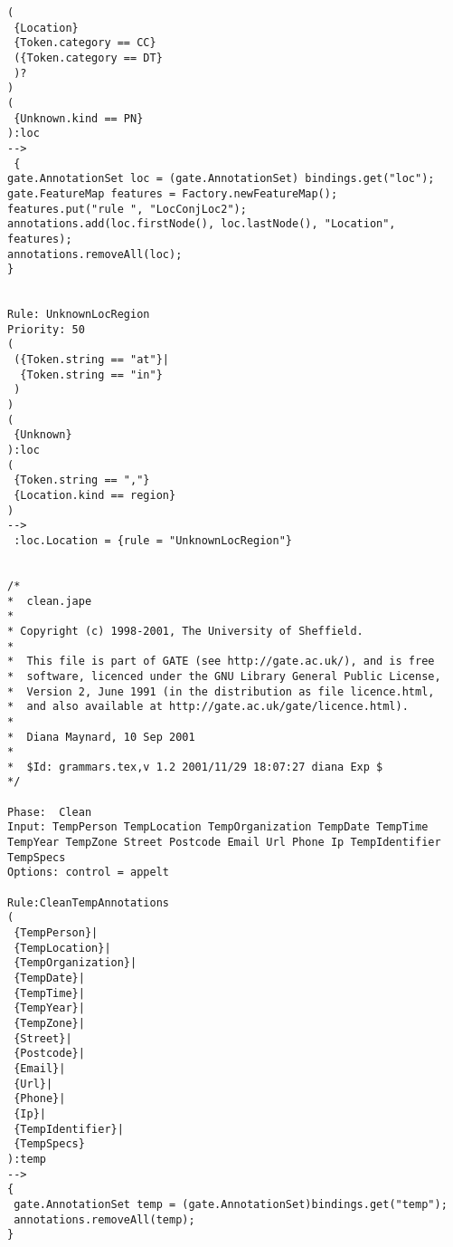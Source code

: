 \begin{verbatim}
(
 {Location}
 {Token.category == CC}
 ({Token.category == DT}
 )?
)
(
 {Unknown.kind == PN}
):loc
-->
 {
gate.AnnotationSet loc = (gate.AnnotationSet) bindings.get("loc");
gate.FeatureMap features = Factory.newFeatureMap();
features.put("rule ", "LocConjLoc2");
annotations.add(loc.firstNode(), loc.lastNode(), "Location",
features);
annotations.removeAll(loc);
}


Rule: UnknownLocRegion
Priority: 50
(
 ({Token.string == "at"}|
  {Token.string == "in"}
 )
)
( 
 {Unknown}
):loc
(
 {Token.string == ","}
 {Location.kind == region}
)
-->
 :loc.Location = {rule = "UnknownLocRegion"}


/*
*  clean.jape
*
* Copyright (c) 1998-2001, The University of Sheffield.
*
*  This file is part of GATE (see http://gate.ac.uk/), and is free
*  software, licenced under the GNU Library General Public License,
*  Version 2, June 1991 (in the distribution as file licence.html,
*  and also available at http://gate.ac.uk/gate/licence.html).
*
*  Diana Maynard, 10 Sep 2001
* 
*  $Id: grammars.tex,v 1.2 2001/11/29 18:07:27 diana Exp $
*/

Phase:	Clean
Input: TempPerson TempLocation TempOrganization TempDate TempTime TempYear TempZone Street Postcode Email Url Phone Ip TempIdentifier TempSpecs
Options: control = appelt

Rule:CleanTempAnnotations
(
 {TempPerson}|
 {TempLocation}|
 {TempOrganization}|
 {TempDate}|
 {TempTime}|
 {TempYear}|
 {TempZone}|
 {Street}|
 {Postcode}|
 {Email}|
 {Url}|
 {Phone}|
 {Ip}|
 {TempIdentifier}|
 {TempSpecs}
):temp
-->
{
 gate.AnnotationSet temp = (gate.AnnotationSet)bindings.get("temp");
 annotations.removeAll(temp);
}

\end{verbatim}